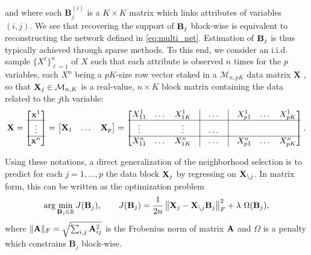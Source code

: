 and where each $\mathbf{B}_j^{(i)}$ is a $K\times K$ matrix which
links attributes of variables $(i,j)$.  We see that recovering the
support of $\mathbf{B}_j$ block-wise is equivalent to reconstructing the
network defined in \eqref{eq:multi_net}.  Estimation of $\mathbf{B}_j$ is
thus typically achieved through sparse methods.  To this end, we
consider an i.i.d.  sample $\{X^\ell\}_{\ell=1}^n$ of $X$ such that
each attribute is observed $n$ times for the $p$ variables, each $X^n$
being a $pK$-size row vector staked in a $\mathcal{M}_{n,pK}$ data
matrix $\mathbf{X}$ , so that $\mathbf{X}_j \in \mathcal{M}_{n,K}$ is a
real-value, $n \times K$ block matrix containing the data related to
the $j$th variable:
\begin{multline*}
  \mathbf{X} = \begin{bmatrix}
    \mathbf{x}^1 \\ \hline
    \vdots \\\hline
    \mathbf{x}^n \\
  \end{bmatrix}
  = \begin{bmatrix}
    \mathbf{X}_1 & \dots & \mathbf{X}_p \\
  \end{bmatrix} 
  = \begin{bmatrix}
    X_{11}^1 & \dots & X_{1K}^1 & \vline & \dots & \vline & X_{p1}^1 & \dots & X_{pK}^1 \\ \hline
    \vdots & & \vdots & \vline & \dots & \vline & & & \\ \hline
    X_{11}^n & \dots & X_{1K}^n & \vline & \dots & \vline & X_{p1}^n & \dots & X_{pK}^n \\ 
  \end{bmatrix}.
\end{multline*}

Using  these notations,  a direct  generalization of  the neighborhood
selection is to  predict for each $j=1,\dots,p$ the  data block $\mathbf{X}_j$
by regressing  on $\mathbf{X}_{\backslash  j}$. In matrix  form, this  can be
written as the optimization problem
\begin{equation}
  \label{eq:multi_penalized}
  \arg  \min_{\bB_j  \in  \mathbb{R}}  J(\bB_j),  \qquad
  J(\bB_j) = \frac{1}{2n} \left\|
    \bX_j - \bX_{\backslash j}\bB_j\right\|_F^2 +
  \lambda \ \Omega(\bB_j),
\end{equation}
where $\|\mathbf{A}\|_F = \sqrt{\sum_{i,j} \mathbf{A}_{ij}^2}$ is the Frobenius norm
of  matrix   $\mathbf{A}$  and  $\Omega$   is  a  penalty   which  constrains
$\mathbf{B}_j$ block-wise.

